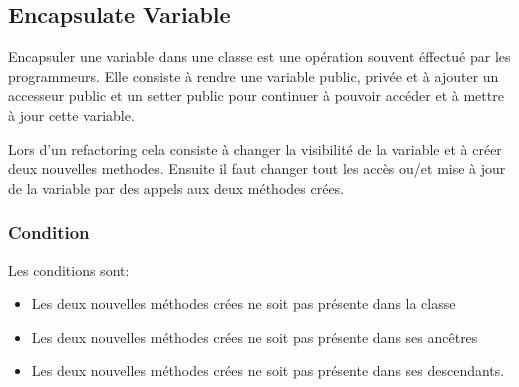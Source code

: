 \documentclass[a4paper, 12pt]{article}
\begin{document}
\subsection{Encapsulate Variable}

Encapsuler une variable dans une classe est une opération souvent éffectué par les programmeurs. 
Elle consiste à rendre une variable public, privée et à ajouter un accesseur public et un setter public pour continuer à pouvoir accéder et à mettre à jour cette variable.

Lors d'un refactoring cela consiste à changer la visibilité de la variable et à créer deux nouvelles methodes. Ensuite il faut changer tout les accès ou/et mise à jour de la variable par des appels aux deux méthodes crées.

\subsubsection{Condition}
Les conditions sont:
\begin{itemize}
\item Les deux nouvelles méthodes crées ne soit pas présente dans la classe
\item Les deux nouvelles méthodes crées ne soit pas présente dans ses ancêtres 
\item Les deux nouvelles méthodes crées ne soit pas présente dans ses descendants.
\end{itemize}
\end{document}
